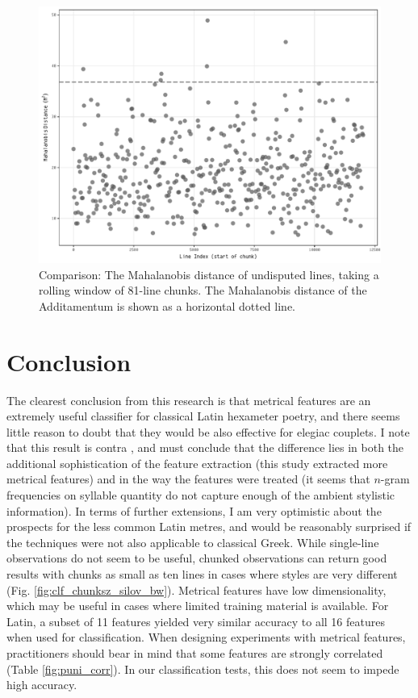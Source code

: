 \documentclass[11pt,a4paper]{scrartcl} %
\begin{document}
{\begin{figure}[h]
    \caption{Comparison: The Mahalanobis distance of undisputed lines, taking a rolling window of 81-line chunks. The Mahalanobis distance of the Additamentum is shown as a horizontal dotted line.}
    \label{fig:rolling_weirdness}
    \includegraphics[width=\textwidth]{rolling_weirdness_bw.pdf}
\end{figure}

\section{Conclusion}
The clearest conclusion from this research is that metrical features are an extremely useful classifier for classical Latin hexameter poetry, and there seems little reason to doubt that they would be also effective for elegiac couplets. I note that this result is contra \citet[293]{forstall_evidence_2011}, and must conclude that the difference lies in both the additional sophistication of the feature extraction (this study extracted more metrical features) and in the way the features were treated (it seems that $n$-gram frequencies on syllable quantity do not capture enough of the ambient stylistic information). In terms of further extensions, I am very optimistic about the prospects for the less common Latin metres, and would be reasonably surprised if the techniques were not also applicable to classical Greek. While single-line observations do not seem to be useful, chunked observations can return good results with chunks as small as ten lines in cases where styles are very different (Fig. \ref{fig:clf_chunksz_silov_bw}). Metrical features have low dimensionality, which may be useful in cases where limited training material is available. For Latin, a subset of 11 features yielded very similar accuracy to all 16 features when used for classification. When designing experiments with metrical features, practitioners should bear in mind that some features are strongly correlated (Table \ref{fig:puni_corr}). In our classification tests, this does not seem to impede high accuracy.

}
\end{document}
